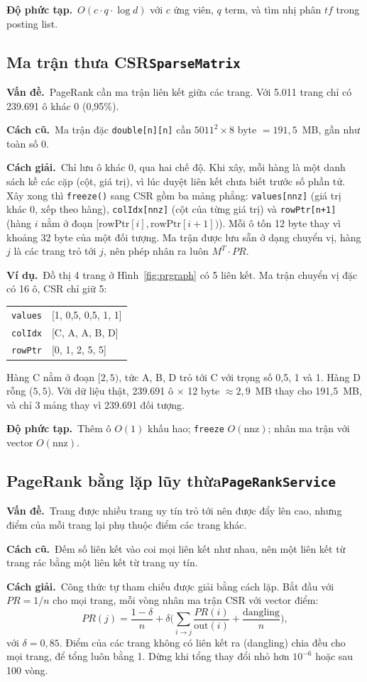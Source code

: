 \documentclass[9pt,twocolumn,a4paper]{extarticle}
\newcommand{\code}[1]{\texttt{#1}}
\newcommand{\dsa}[2]{\subsection[#1]{#1\hfill{\normalfont\footnotesize\code{#2}}}}
\newcommand{\vande}{\textcolor{linkblue}{\textbf{Vấn đề.}}~}
\newcommand{\cachgiai}{\textcolor{linkblue}{\textbf{Cách giải.}}~}
\newcommand{\dpt}{\textcolor{linkblue}{\textbf{Độ phức tạp.}}~}
\newcommand{\cu}{\textcolor{linkblue}{\textbf{Cách cũ.}}~}
\newcommand{\vidu}{\textcolor{linkblue}{\textbf{Ví dụ.}}~}
\begin{document}
\dpt $O(c\cdot q\cdot\log d)$ với $c$ ứng viên, $q$ term, và tìm nhị phân $tf$ trong posting list.

\dsa{Ma trận thưa CSR}{SparseMatrix}
\vande PageRank cần ma trận liên kết giữa các trang. Với 5.011 trang chỉ có 239.691 ô khác 0 (0,95\%).

\cu Ma trận đặc \code{double[n][n]} cần $5011^2\times8$ byte $=191{,}5$~MB, gần như toàn số 0.

\cachgiai Chỉ lưu ô khác 0, qua hai chế độ. Khi xây, mỗi hàng là một danh sách kề các cặp (cột, giá trị), vì lúc duyệt liên kết chưa biết trước số phần tử. Xây xong thì \code{freeze()} sang CSR gồm ba mảng phẳng: \code{values[nnz]} (giá trị khác 0, xếp theo hàng), \code{colIdx[nnz]} (cột của từng giá trị) và \code{rowPtr[n+1]} (hàng $i$ nằm ở đoạn $[\text{rowPtr}[i],\text{rowPtr}[i+1])$). Mỗi ô tốn 12 byte thay vì khoảng 32 byte của một đối tượng. Ma trận được lưu sẵn ở dạng chuyển vị, hàng $j$ là các trang trỏ tới $j$, nên phép nhân ra luôn $M^{T}\cdot PR$.

\vidu Đồ thị 4 trang ở Hình~\ref{fig:prgraph} có 5 liên kết. Ma trận chuyển vị đặc có 16 ô, CSR chỉ giữ 5:
\begin{center}\footnotesize
\begin{tabular}{@{}ll@{}}
\code{values} & [1, 0,5, 0,5, 1, 1] \\
\code{colIdx} & [C, A, A, B, D] \\
\code{rowPtr} & [0, 1, 2, 5, 5] \\
\end{tabular}
\end{center}
Hàng C nằm ở đoạn $[2,5)$, tức A, B, D trỏ tới C với trọng số 0,5, 1 và 1. Hàng D rỗng ($5,5$). Với dữ liệu thật, 239.691 ô $\times$ 12 byte $\approx 2{,}9$~MB thay cho 191,5~MB, và chỉ 3 mảng thay vì 239.691 đối tượng.

\dpt Thêm ô $O(1)$ khấu hao; \code{freeze} $O(\text{nnz})$; nhân ma trận với vector $O(\text{nnz})$.

\dsa{PageRank bằng lặp lũy thừa}{PageRankService}
\vande Trang được nhiều trang uy tín trỏ tới nên được đẩy lên cao, nhưng điểm của mỗi trang lại phụ thuộc điểm các trang khác.

\cu Đếm số liên kết vào coi mọi liên kết như nhau, nên một liên kết từ trang rác bằng một liên kết từ trang uy tín.

\cachgiai Công thức tự tham chiếu \cite{brin1998} được giải bằng cách lặp. Bắt đầu với $PR=1/n$ cho mọi trang, mỗi vòng nhân ma trận CSR với vector điểm:
\begin{equation}
PR(j)=\frac{1-\delta}{n}+\delta\Big(\sum_{i\to j}\frac{PR(i)}{\text{out}(i)}+\frac{\text{dangling}}{n}\Big),
\label{eq:pagerank}
\end{equation}
với $\delta=0{,}85$. Điểm của các trang không có liên kết ra (dangling) chia đều cho mọi trang, để tổng luôn bằng 1. Dừng khi tổng thay đổi nhỏ hơn $10^{-6}$ hoặc sau 100 vòng.
\end{document}
